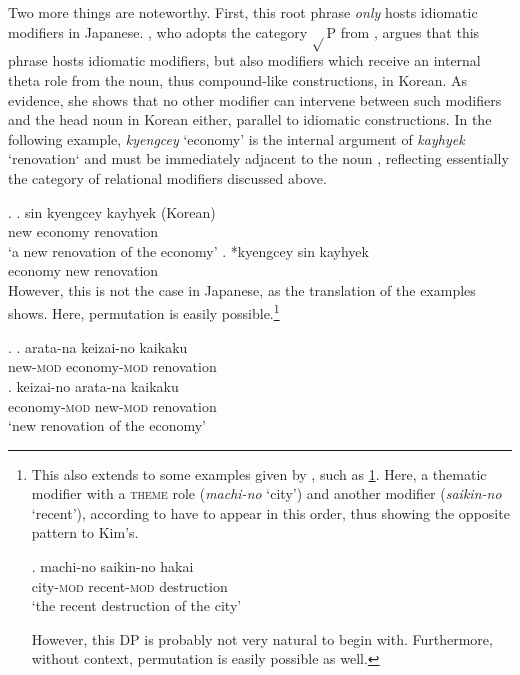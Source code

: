 \documentclass [output=book,colorlinks,citecolor=brown]{langscibook}
\begin{document}
Two more things are noteworthy. First, this root phrase \textit{only} hosts idiomatic modifiers in Japanese. \citet[130]{kim:2019:syntax}, who adopts the category $\sqrt{}$P from \citet{svenonius:2008:position}, argues that this phrase hosts idiomatic modifiers, but also modifiers which receive an internal theta role from the noun, thus compound-like constructions, in Korean. As evidence, she shows that no other modifier can intervene between such modifiers and the head noun in Korean either, parallel to idiomatic constructions. In the following example, \textit{kyengcey} `economy' is the internal argument of \textit{kayhyek} `renovation‘ and must be immediately adjacent to the noun \citep[130]{kim:2019:syntax}, reflecting essentially the category of relational modifiers discussed above. %


\ex. \ag. sin kyengcey kayhyek (Korean)\\
new economy renovation\\
`a new renovation of the economy'
\bg. *kyengcey sin kayhyek\\
economy new renovation \null \hfill \citep[130]{kim:2019:syntax}\\

However, this is not the case in Japanese, as the translation of the examples shows. Here, permutation is easily possible.\footnote{This also extends to some examples given by \citet{laenzlinger:2011:elements}, such as \ref{machi-no saikin-no}. Here, a thematic modifier with a \textsc{theme} role (\textit{machi-no} `city’) and another modifier (\textit{saikin-no} `recent’), according to \citet{laenzlinger:2011:elements} have to appear in this order, thus showing the opposite pattern to Kim’s.

\par

\exg. machi-no saikin-no hakai\\
city-\textsc{mod} recent-\textsc{mod} destruction\\
`the recent destruction of the city’ \hfill \citep[227–228]{laenzlinger:2011:elements} \label{machi-no saikin-no}

\par


However, this DP is probably not very natural to begin with. Furthermore, without context, permutation is easily possible as well.}

\ex. \ag. arata-na keizai-no kaikaku\\
new-\textsc{mod} economy-\textsc{mod} renovation\\
\bg. keizai-no arata-na kaikaku\\
economy-\textsc{mod} new-\textsc{mod} renovation\\
`new renovation of the economy'
\end{document}
